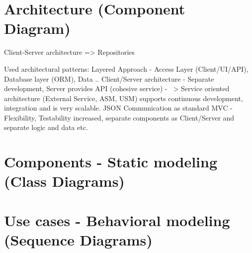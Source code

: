 \documentclass[a4paper,11pt]{article}
\begin{document}
\section{Architecture (Component Diagram)}

Client-Server architecture => Repositories
	

Used architectural patterns:
Layered Approach 
	- Access Layer (Client/UI/API), Database layer (ORM), Data .. 
Client/Server architecture
	- Separate development, Server provides API (cohesive service)
	- ~> Service oriented architecture (External Service, ASM, USM) supports continuous development, integration and is very scalable. JSON Communication as standard
MVC 
	- Flexibility, Testability increased, separate components as Client/Server and separate logic and data etc.

\section{Components - Static modeling (Class Diagrams)}

\section{Use cases - Behavioral modeling (Sequence Diagrams)}
\end{document}
